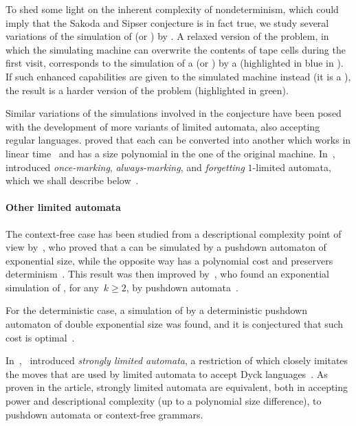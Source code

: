 To shed some light on the inherent complexity of nondeterminism, which could imply that the Sakoda and Sipser conjecture is in fact true, we study several variations of the simulation of \TNFA (or \ONFA) by \TDFA.
A relaxed version of the problem, in which the simulating machine can overwrite the contents of tape cells during the first visit, corresponds to the simulation of a \TNFA (or \ONFA) by a \ODLA (highlighted in blue in ).
If such enhanced capabilities are given to the simulated machine instead (\ie it is a \OLA), the result is a harder version of the problem (highlighted in green).

Similar variations of the simulations involved in the conjecture have been posed with the development of more variants of limited automata, also accepting regular languages.
\citeauthor{GuiPri19} proved that each \OLA can be converted into another \OLA which works in linear time~\cite{GuiPri19} and has a size polynomial in the one of the original machine.
In~\citeyear{PigPri23a},~\citeauthor{PigPri23a} introduced \emph{once-marking}, \emph{always-marking}, and \emph{forgetting} $1$-limited automata, which we shall describe below~\cite{PigPri23a,PigPri23}.


\paragraph{Other limited automata}
The context-free case has been studied from a descriptional complexity point of view by~\citeauthor{PigPis15}, who proved that a  can be simulated by a pushdown automaton of exponential size, while the opposite way has a polynomial cost and preservers determinism~\cite{PigPis15}.
This result was then improved by~\citeauthor{KutPig+18}, who found an exponential simulation of \kLAs, for any~$k\ge2$, by pushdown automata~\cite{KutPig+18}.

For the deterministic case, a simulation of  by a deterministic pushdown automaton of double exponential size was found, and it is conjectured that such cost is optimal~\cite{PigPis15}.

In~\citeyear{Pig16},~\citeauthor{Pig16} introduced \emph{strongly limited automata}, a restriction of  which closely imitates the moves that are used by limited automata to accept Dyck languages~\cite{Pig16}.
As proven in the article, strongly limited automata are equivalent, both in accepting power and descriptional complexity (up to a polynomial size difference), to pushdown automata or context-free grammars.


